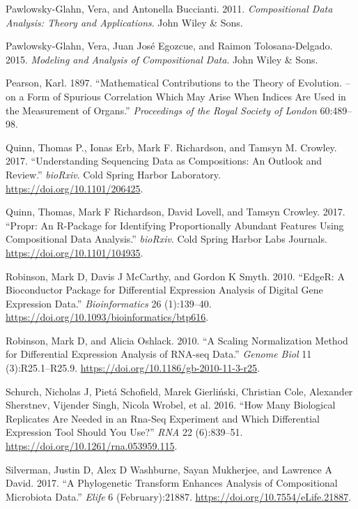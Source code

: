 \documentclass[onecolumn]{book}
\theoremstyle{definition}
\theoremstyle{definition}
\theoremstyle{definition}
\theoremstyle{remark}
\begin{document}
\leavevmode\hypertarget{ref-pawlowsky2011compositional}{}%
Pawlowsky-Glahn, Vera, and Antonella Buccianti. 2011.
\emph{Compositional Data Analysis: Theory and Applications}. John Wiley
\& Sons.

\leavevmode\hypertarget{ref-pawlowsky2015modeling}{}%
Pawlowsky-Glahn, Vera, Juan José Egozcue, and Raimon Tolosana-Delgado.
2015. \emph{Modeling and Analysis of Compositional Data}. John Wiley \&
Sons.

\leavevmode\hypertarget{ref-Pearson:1896}{}%
Pearson, Karl. 1897. ``Mathematical Contributions to the Theory of
Evolution. -- on a Form of Spurious Correlation Which May Arise When
Indices Are Used in the Measurement of Organs.'' \emph{Proceedings of
the Royal Society of London} 60:489--98.

\leavevmode\hypertarget{ref-Quinn206425}{}%
Quinn, Thomas P., Ionas Erb, Mark F. Richardson, and Tamsyn M. Crowley.
2017. ``Understanding Sequencing Data as Compositions: An Outlook and
Review.'' \emph{bioRxiv}. Cold Spring Harbor Laboratory.
\url{https://doi.org/10.1101/206425}.

\leavevmode\hypertarget{ref-Quinn:2017}{}%
Quinn, Thomas, Mark F Richardson, David Lovell, and Tamsyn Crowley.
2017. ``Propr: An R-Package for Identifying Proportionally Abundant
Features Using Compositional Data Analysis.'' \emph{bioRxiv}. Cold
Spring Harbor Labs Journals. \url{https://doi.org/10.1101/104935}.

\leavevmode\hypertarget{ref-Robinson:2010}{}%
Robinson, Mark D, Davis J McCarthy, and Gordon K Smyth. 2010. ``EdgeR: A
Bioconductor Package for Differential Expression Analysis of Digital
Gene Expression Data.'' \emph{Bioinformatics} 26 (1):139--40.
\url{https://doi.org/10.1093/bioinformatics/btp616}.

\leavevmode\hypertarget{ref-Robinson:2010a}{}%
Robinson, Mark D, and Alicia Oshlack. 2010. ``A Scaling Normalization
Method for Differential Expression Analysis of RNA-seq Data.''
\emph{Genome Biol} 11 (3):R25.1--R25.9.
\url{https://doi.org/10.1186/gb-2010-11-3-r25}.

\leavevmode\hypertarget{ref-Schurch:2016aa}{}%
Schurch, Nicholas J, Pietá Schofield, Marek Gierliński, Christian Cole,
Alexander Sherstnev, Vijender Singh, Nicola Wrobel, et al. 2016. ``How
Many Biological Replicates Are Needed in an Rna-Seq Experiment and Which
Differential Expression Tool Should You Use?'' \emph{RNA} 22
(6):839--51. \url{https://doi.org/10.1261/rna.053959.115}.

\leavevmode\hypertarget{ref-Silverman:2017aa}{}%
Silverman, Justin D, Alex D Washburne, Sayan Mukherjee, and Lawrence A
David. 2017. ``A Phylogenetic Transform Enhances Analysis of
Compositional Microbiota Data.'' \emph{Elife} 6 (February):21887.
\url{https://doi.org/10.7554/eLife.21887}.
\end{document}
